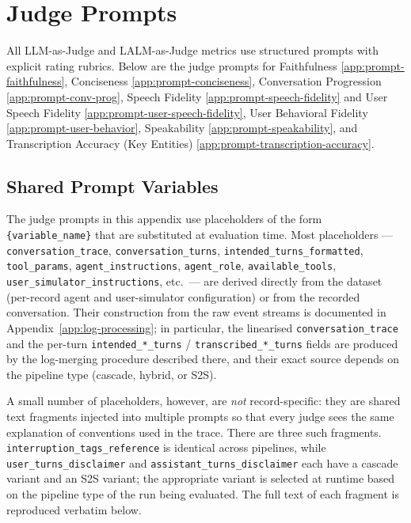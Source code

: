 \clearpage
\section{Judge Prompts}
\label{app:prompts}

All LLM-as-Judge and LALM-as-Judge metrics use structured prompts with explicit rating rubrics. Below are the judge prompts for Faithfulness \ref{app:prompt-faithfulness}, Conciseness \ref{app:prompt-conciseness}, Conversation Progression \ref{app:prompt-conv-prog}, Speech Fidelity \ref{app:prompt-speech-fidelity} and User Speech Fidelity \ref{app:prompt-user-speech-fidelity}, User Behavioral Fidelity \ref{app:prompt-user-behavior}, Speakability \ref{app:prompt-speakability}, and Transcription Accuracy (Key Entities) \ref{app:prompt-transcription-accuracy}.

\subsection{Shared Prompt Variables}
\label{app:prompt-shared-variables}

The judge prompts in this appendix use placeholders of the form \texttt{\{variable\_name\}} that are substituted at evaluation time. Most placeholders --- \texttt{conversation\_trace}, \texttt{conversation\_turns}, \texttt{intended\_turns\_formatted}, \texttt{tool\_params}, \texttt{agent\_instructions}, \texttt{agent\_role}, \texttt{available\_tools}, \texttt{user\_simulator\_instructions}, etc.\ --- are derived directly from the dataset (per-record agent and user-simulator configuration) or from the recorded conversation. Their construction from the raw event streams is documented in Appendix~\ref{app:log-processing}; in particular, the linearised \texttt{conversation\_trace} and the per-turn \texttt{intended\_*\_turns} / \texttt{transcribed\_*\_turns} fields are produced by the log-merging procedure described there, and their exact source depends on the pipeline type (cascade, hybrid, or S2S).

A small number of placeholders, however, are \emph{not} record-specific: they are shared text fragments injected into multiple prompts so that every judge sees the same explanation of conventions used in the trace. There are three such fragments. \texttt{interruption\_tags\_reference} is identical across pipelines, while \texttt{user\_turns\_disclaimer} and \texttt{assistant\_turns\_disclaimer} each have a cascade variant and an S2S variant; the appropriate variant is selected at runtime based on the pipeline type of the run being evaluated. The full text of each fragment is reproduced verbatim below.

